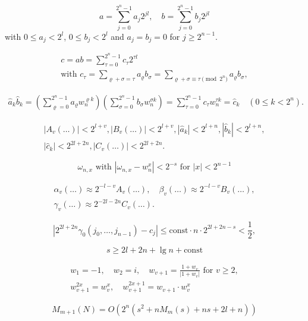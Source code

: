 \documentclass{article}
\begin{document}
\[
\tag{3.2}
a = \sum_{j = 0}^{2^n - 1} a_j 2^{jl}, \quad b = \sum_{j = 0}^{2^n - 1} b_j 2^{jl}
\] with $0 \le a_j < 2^l$, $0 \le b_j < 2^l$ and $a_j = b_j = 0$ for $j \ge 2^{n - 1}$.

\[
\tag{3.3}
\begin{gathered}
c = ab = \sum_{\tau = 0}^{2^n - 1} c_\tau 2^{\tau l} \\
\text{with }c_\tau = \sum_{\varrho + \sigma = \tau} a_\varrho b_\sigma = \sum_{\varrho + \sigma \equiv \tau \pmod{2^n}} a_\varrho b_\sigma,
\end{gathered}
\]

\[
\tag{3.4}
\begin{gathered}
\hat{a}_k \hat{b}_k = \left(\sum_{\varrho = 0}^{2^n - 1} a_\varrho w_n^{\varrho k}\right) \left(\sum_{\sigma = 0}^{2^n - 1} b_\sigma w_n^{\sigma k}\right) = \sum_{\tau = 0}^{2^n - 1} c_\tau w_n^{\tau k} = \hat{c}_k \quad (0 \le k < 2^n).
\end{gathered}
\]

\[
\begin{gathered}
|A_v(\ldots)| < 2^{l + v}, |B_v(\ldots)| < 2^{l + v}, |\hat{a}_k| < 2^{l + n}, |\hat{b}_k| < 2^{l + n}, \\
|\hat{c}_k| < 2^{2l + 2n}, |C_v(\ldots)| < 2^{2l + 2n}.
\end{gathered}
\]

\[
\omega_{n, x}\text{ with }|\omega_{n, x} - w_n^x| < 2^{-s}\text{ for }|x| < 2^{n - 1}
\]

\[
\begin{gathered}
\alpha_v (\ldots) \approx 2^{-l - v} A_v(\ldots), \quad \beta_v(\ldots) \approx 2^{-l - v} B_v(\ldots), \\
\gamma_v(\ldots) \approx 2^{-2l - 2n} C_v (\ldots).
\end{gathered}
\]

\[
\left|2^{2l + 2n} \gamma_0 (j_0, \ldots, j_{n - 1}) - c_j\right| \le \text{const} \cdot n \cdot 2^{2l + 2n - s} < \frac{1}{2},
\]

\[
\tag{3.9}
s \ge 2l + 2n + \lg n + \text{const}
\]

\[
\begin{gathered}
w_1 = -1, \quad w_2 = i, \quad w_{v + 1} = \frac{1 + w_v}{|1 + w_v|}\text{ for }v \ge 2,\\
w_{v + 1}^{2 x} = w_v^x, \quad w_{v + 1}^{2x + 1} = w_{v + 1} \cdot w_v^x
\end{gathered}
\]

\[
M_{m + 1}(N) = O(2^n (s^2 + n M_m(s) + ns + 2l + n))
\]
\end{document}
